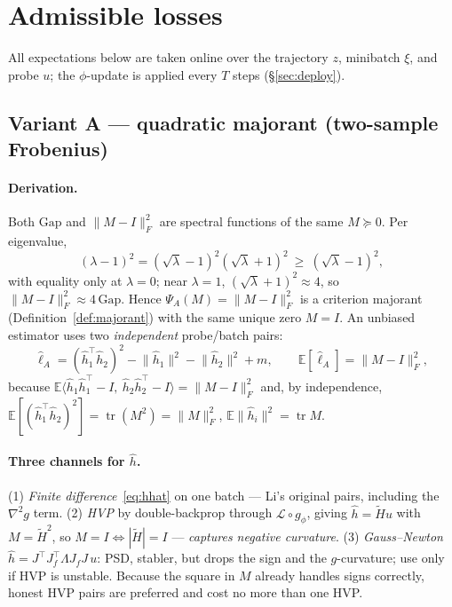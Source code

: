 \documentclass[11pt]{article}
\theoremstyle{plain}
\theoremstyle{definition}
\theoremstyle{remark}
\DeclareMathOperator{\tr}{tr}
\newcommand{\E}{\mathbb{E}}
\newcommand{\Loss}{\mathcal{L}}
\newcommand{\Fnorm}[1]{\lVert #1 \rVert_F}
\newcommand{\norm}[1]{\lVert #1 \rVert}
\newcommand{\tHess}{\tilde{H}}
\newcommand{\hh}{\hat{h}}
\begin{document}
\section{Admissible losses}
\label{sec:accepted}

All expectations below are taken online over the trajectory $z$, minibatch $\xi$, and probe
$u$; the $\phi$-update is applied every $T$ steps (\S\ref{sec:deploy}).

\subsection{Variant A --- quadratic majorant (two-sample Frobenius)}
\label{sub:A}
\paragraph{Derivation.} Both $\mathrm{Gap}$ and $\Fnorm{M-I}^2$ are spectral functions of the
same $M\succeq0$. Per eigenvalue,
\begin{equation}
\label{eq:A-majorant}
  (\lambda-1)^2=(\sqrt\lambda-1)^2(\sqrt\lambda+1)^2\ \ge\ (\sqrt\lambda-1)^2 ,
\end{equation}
with equality only at $\lambda=0$; near $\lambda=1$, $(\sqrt\lambda+1)^2\approx4$, so
$\Fnorm{M-I}^2\approx4\,\mathrm{Gap}$. Hence $\Psi_A(M)=\Fnorm{M-I}^2$ is a criterion
majorant (Definition~\ref{def:majorant}) with the same unique zero $M=I$. An unbiased
estimator uses two \emph{independent} probe/batch pairs:
\begin{equation}
\label{eq:A-est}
  \hat\ell_A=(\hh_1^{\!\top}\hh_2)^2-\norm{\hh_1}^2-\norm{\hh_2}^2+m,
  \qquad \E[\hat\ell_A]=\Fnorm{M-I}^2 ,
\end{equation}
because $\E\big\langle\hh_1\hh_1^{\!\top}-I,\ \hh_2\hh_2^{\!\top}-I\big\rangle=\Fnorm{M-I}^2$
and, by independence, $\E[(\hh_1^{\!\top}\hh_2)^2]=\tr(M^2)=\Fnorm{M}^2$,
$\E\norm{\hh_i}^2=\tr M$.

\paragraph{Three channels for $\hh$.} (1) \emph{Finite difference}~\eqref{eq:hhat} on one
batch --- Li's original pairs, including the $\nabla^2 g$ term. (2) \emph{HVP} by
double-backprop through $\Loss\circ g_\phi$, giving $\hh=\tHess u$ with $M=\tHess^2$, so
$M=I\Leftrightarrow|\tHess|=I$ --- \emph{captures negative curvature}. (3) \emph{Gauss--Newton}
$\hh=J^{\!\top}J_f^{\!\top}\Lambda J_f J\,u$: PSD, stabler, but drops the sign and the
$g$-curvature; use only if HVP is unstable. Because the square in $M$ already handles signs
correctly, honest HVP pairs are preferred and cost no more than one HVP.
\end{document}
